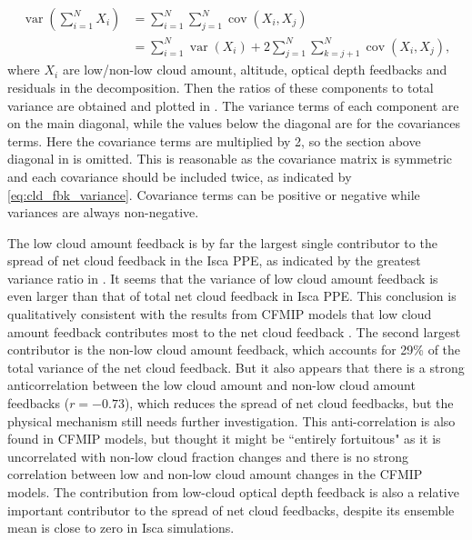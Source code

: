 \begin{equation}
    \begin{aligned}
    \operatorname{var}\left(\sum_{i=1}^{N} X_{i}\right) &=\sum_{i=1}^{N} \sum_{j=1}^{N} \operatorname{cov}\left(X_{i}, X_{j}\right) \\
    &=\sum_{i=1}^{N} \operatorname{var}\left(X_{i}\right)+2 \sum_{j=1}^{N} \sum_{k=j+1}^{N} \operatorname{cov}\left(X_{i}, X_{j}\right),
    \end{aligned}
    \label{eq:cld_fbk_variance}
\end{equation}
where $X_i$ are low/non-low cloud amount, altitude, optical depth feedbacks and residuals in the decomposition. Then the ratios of these components to total variance are obtained and plotted in . The variance terms of each component are on the main diagonal, while the values below the diagonal are for the covariances terms. Here the covariance terms are multiplied by 2, so the section above diagonal in  is omitted. This is reasonable as the covariance matrix is symmetric and each covariance should be included twice, as indicated by \eqref{eq:cld_fbk_variance}. Covariance terms can be positive or negative while variances are always non-negative. 

The low cloud amount feedback is by far the largest single contributor to the spread of net cloud feedback in the Isca PPE, as indicated by the greatest variance ratio in . It seems that the variance of low cloud amount feedback is even larger than that of total net cloud feedback in Isca PPE. This conclusion is qualitatively consistent with the results from CFMIP models that low cloud amount feedback contributes most to the net cloud feedback \citep[][]{Zelinka2016insights}. The second largest contributor is the non-low cloud amount feedback, which accounts for 29\% of the total variance of the net cloud feedback. But it also appears that there is a strong anticorrelation between the low cloud amount and non-low cloud amount feedbacks ($r=-0.73$), which reduces the spread of net cloud feedbacks, but the physical mechanism still needs further investigation. This anti-correlation is also found in CFMIP models, but \cite{Zelinka2016insights} thought it might be ``entirely fortuitous" as it is uncorrelated with non-low cloud fraction changes and there is no strong correlation between low and non-low cloud amount changes in the CFMIP models. The contribution from low-cloud optical depth feedback is also a relative important contributor to the spread of net cloud feedbacks, despite its ensemble mean is close to zero in Isca simulations.

